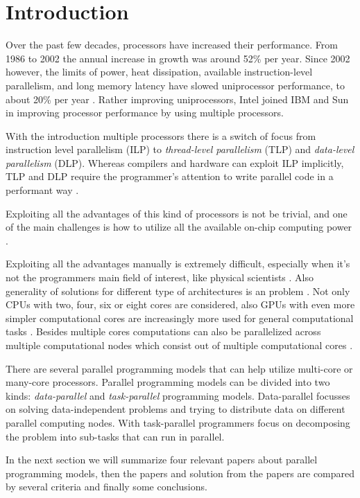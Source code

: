 \section{Introduction} \label{introduction}


Over the past few decades, processors have increased their performance. From
1986 to 2002 the annual increase in growth was around 52\% per year. Since 2002
however, the limits of power, heat dissipation, available instruction-level
parallelism, and long memory latency have slowed uniprocessor performance, to
about 20\% per year \cite{hennessy2007computer}. Rather improving
uniprocessors, Intel joined IBM and Sun in improving processor performance by
using multiple processors.

With the introduction multiple processors there is a switch of focus from
instruction level parallelism (ILP) to \emph{thread-level parallelism} (TLP)
and \emph{data-level parallelism} (DLP). Whereas compilers and hardware can
exploit ILP implicitly, TLP and DLP require the programmer's attention to write
parallel code in a performant way \cite{hennessy2007computer}.

Exploiting all the advantages of this kind of processors is not be trivial, and
one of the main challenges is how to utilize all the available on-chip
computing power \cite{CaoPerformanceAnalysis}.

Exploiting all the advantages manually is extremely difficult, especially when
it's not the programmers main field of interest, like physical scientists
\cite{KimExploitingMultiManyCore}. Also generality of solutions for different
type of architectures is an problem \cite{CaoPerformanceAnalysis}. Not only
CPUs with two, four, six or eight cores are considered, also GPUs with even
more simpler computational cores are increasingly more used for general
computational tasks \cite{ZhangDataParallelProgramming}. Besides multiple cores
computations can also be parallelized across multiple computational nodes which
consist out of multiple computational cores
\cite{BrightwellParallelPhaseModel}.

There are several parallel programming models that can help utilize multi-core
or many-core processors. Parallel programming models can be divided into two
kinds: \emph{data-parallel} and \emph{task-parallel} programming models.
Data-parallel focusses on solving data-independent problems and trying to
distribute data on different parallel computing nodes. With task-parallel
programmers focus on decomposing the problem into sub-tasks that can run in
parallel.

In the next section we will summarize four relevant papers about parallel
programming models, then the papers and solution from the papers are compared
by several criteria and finally some conclusions.
